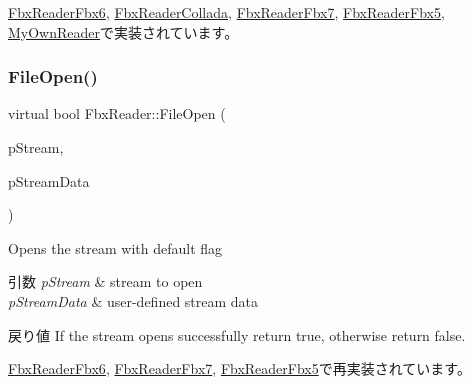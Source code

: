 \hyperlink{class_fbx_reader_fbx6_aae8a88d85353be67413ce60a27873422}{Fbx\+Reader\+Fbx6}, \hyperlink{class_fbx_reader_collada_aec7a5267f85187eeb26dd55ec250119e}{Fbx\+Reader\+Collada}, \hyperlink{class_fbx_reader_fbx7_a06899ecd549ba92789673586d05825cb}{Fbx\+Reader\+Fbx7}, \hyperlink{class_fbx_reader_fbx5_a1aef8cc95eae3b44812beef48d6edb5d}{Fbx\+Reader\+Fbx5}, \hyperlink{class_my_own_reader_a77f7f753ea30442895994a0f6c0479d8}{My\+Own\+Reader}で実装されています。

\mbox{\label{class_fbx_reader_a819487a39b5e25f69a8dccf187ab4ab9}} 
\subsubsection{\texorpdfstring{File\+Open()}{FileOpen()}\hspace{0.1cm}{\footnotesize\ttfamily [2/4]}}
{\footnotesize\ttfamily virtual bool Fbx\+Reader\+::\+File\+Open (\begin{DoxyParamCaption}\item[{\hyperlink{class_fbx_stream}{Fbx\+Stream} $\ast$}]{p\+Stream,  }\item[{void $\ast$}]{p\+Stream\+Data }\end{DoxyParamCaption})\hspace{0.3cm}{\ttfamily [virtual]}}

Opens the stream with default flag 
\begin{DoxyParams}{引数}
{\em p\+Stream} & stream to open \\
\hline
{\em p\+Stream\+Data} & user-\/defined stream data \\
\hline
\end{DoxyParams}
\begin{DoxyReturn}{戻り値}
If the stream opens successfully return {\ttfamily true}, otherwise return {\ttfamily false}. 
\end{DoxyReturn}


\hyperlink{class_fbx_reader_fbx6_a841f736cd6203c124aba426b66559968}{Fbx\+Reader\+Fbx6}, \hyperlink{class_fbx_reader_fbx7_a3ae495d359793c9389f02a1ed1e435ff}{Fbx\+Reader\+Fbx7}, \hyperlink{class_fbx_reader_fbx5_a1ac1c0598fea61e91ac2c98de15a0d24}{Fbx\+Reader\+Fbx5}で再実装されています。

\mbox{\label{class_fbx_reader_a345b292805ea8799a9d962714e1ad9a5}} 
